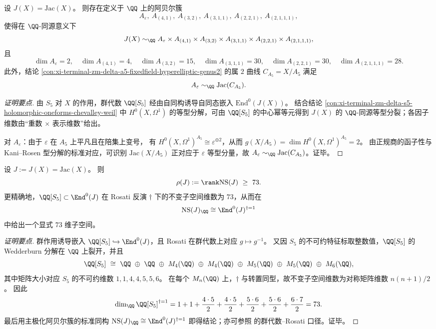 \begin{conclusion}\label{con:xi-terminal-zm-delta-s5-jacobian-qisogeny-decomposition}
设 \(J(X)=\mathrm{Jac}(X)\)。
则存在定义于 \(\QQ\) 上的阿贝尔簇
\[
A_\varepsilon,\ A_{(4,1)},\ A_{(3,2)},\ A_{(3,1,1)},\ A_{(2,2,1)},\ A_{(2,1,1,1)},
\]
使得在 \(\QQ\)-同源意义下
\[
J(X)\sim_{\QQ}
A_\varepsilon\times A_{(4,1)}\times A_{(3,2)}\times A_{(3,1,1)}\times A_{(2,2,1)}\times A_{(2,1,1,1)},
\]
且
\[
\dim A_\varepsilon=2,\quad
\dim A_{(4,1)}=4,\quad
\dim A_{(3,2)}=15,\quad
\dim A_{(3,1,1)}=30,\quad
\dim A_{(2,2,1)}=30,\quad
\dim A_{(2,1,1,1)}=28.
\]
此外，结论 \ref{con:xi-terminal-zm-delta-a5-fixedfield-hyperelliptic-genus2} 的属 \(2\) 曲线 \(C_{A_5}=X/A_5\) 满足
\[
A_\varepsilon\sim_{\QQ}\mathrm{Jac}(C_{A_5}).
\]
\end{conclusion}
\begin{proof}[证明要点]
由 \(S_5\) 对 \(X\) 的作用，群代数 \(\QQ[S_5]\) 经由自同构诱导自同态嵌入 \(\mathrm{End}^0(J(X))\)。
结合结论 \ref{con:xi-terminal-zm-delta-s5-holomorphic-oneforms-chevalley-weil} 中 \(H^0(X,\Omega^1)\) 的等型分解，可由 \(\QQ[S_5]\) 的中心幂等元得到 \(J(X)\) 的 \(\QQ\)-同源等型分裂；各因子维数由“重数 \(\times\) 表示维数”给出。
\par
对 \(A_\varepsilon\)：由于 \(\varepsilon\) 在 \(A_5\) 上平凡且在陪集上变号，
有 \(H^0(X,\Omega^1)^{A_5}\cong \varepsilon^{\oplus 2}\)，从而
\(
g(X/A_5)=\dim H^0(X,\Omega^1)^{A_5}=2
\)。
由正规商的函子性与 Kani--Rosen 型分解的标准对应，可识别 \(\mathrm{Jac}(X/A_5)\) 正对应于 \(\varepsilon\) 等型分量，故 \(A_\varepsilon\sim_{\QQ}\mathrm{Jac}(C_{A_5})\)。证毕。
\end{proof}

\begin{conclusion}\label{con:xi-terminal-zm-delta-s5-jacobian-neron-severi-rank-lower-bound-73}
设 \(J:=J(X)=\mathrm{Jac}(X)\)。
则
\[
\rho(J):=\rank \mathrm{NS}(J)\ \ge\ 73.
\]
更精确地，\(\QQ[S_5]\subset \End^0(J)\) 在 Rosati 反演 \(\dagger\) 下的不变子空间维数为 \(73\)，从而在
\[
\mathrm{NS}(J)_{\QQ}\cong \End^0(J)^{\dagger=1}
\]
中给出一个显式 \(73\) 维子空间。
\end{conclusion}
\begin{proof}[证明要点]
群作用诱导嵌入 \(\QQ[S_5]\hookrightarrow \End^0(J)\)，且 Rosati 在群代数上对应 \(g\mapsto g^{-1}\)。
又因 \(S_5\) 的不可约特征标取整数值，\(\QQ[S_5]\) 的 Wedderburn 分解在 \(\QQ\) 上裂开，并且
\[
\QQ[S_5]\ \cong\ \QQ\ \oplus\ \QQ\ \oplus\ M_4(\QQ)\ \oplus\ M_4(\QQ)\ \oplus\ M_5(\QQ)\ \oplus\ M_5(\QQ)\ \oplus\ M_6(\QQ),
\]
其中矩阵大小对应 \(S_5\) 的不可约维数 \(1,1,4,4,5,5,6\)。
在每个 \(M_n(\QQ)\) 上，\(\dagger\) 与转置同型，故不变子空间维数为对称矩阵维数 \(n(n+1)/2\)。
因此
\[
\dim_{\QQ}\QQ[S_5]^{\dagger=1}
=1+1+\frac{4\cdot 5}{2}+\frac{4\cdot 5}{2}+\frac{5\cdot 6}{2}+\frac{5\cdot 6}{2}+\frac{6\cdot 7}{2}
=73.
\]
最后用主极化阿贝尔簇的标准同构 \(\mathrm{NS}(J)_{\QQ}\cong \End^0(J)^{\dagger=1}\) 即得结论；亦可参照 \cite{Internal2026S5JacobianPrymNSRank} 的群代数--Rosati 口径。证毕。
\end{proof}

